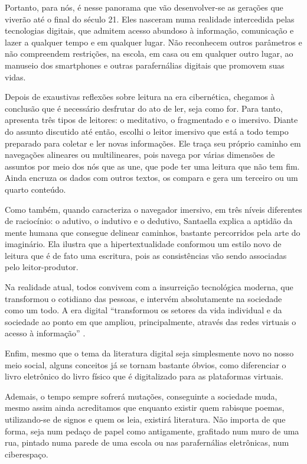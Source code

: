 \begin{refsection}
    Portanto, para nós, é nesse panorama que vão desenvolver-se as gerações que viverão até o final do século 21. Eles nasceram numa realidade intercedida pelas tecnologias digitais, que admitem acesso abundoso à informação, comunicação e lazer a qualquer tempo e em qualquer lugar. Não reconhecem outros parâmetros e não compreendem restrições, na escola, em casa ou em qualquer outro lugar, ao manuseio dos smartphones e outras parafernálias digitais que promovem suas vidas.  

    Depois de exaustivas reflexões sobre leitura na era cibernética, chegamos à conclusão que é necessário desfrutar do ato de ler, seja como for.  Para tanto, \textcite{Santaella2004Navegar} apresenta três tipos de leitores: o meditativo, o fragmentado e o imersivo. Diante do assunto discutido até então, escolhi o leitor imersivo que está a todo tempo preparado para coletar e ler novas informações. Ele traça seu próprio caminho em navegações alineares ou multilineares, pois navega por várias dimensões de assuntos por meio dos nós que as une, que pode ter uma leitura que não tem fim. Ainda encruza os dados com outros textos, os compara e gera um terceiro ou um quarto conteúdo.  

    Como também, quando caracteriza o navegador imersivo, em três níveis diferentes de raciocínio: o adutivo, o indutivo e o dedutivo, Santaella explica a aptidão da mente humana que consegue delinear caminhos, bastante percorridos pela arte do imaginário. Ela ilustra que a hipertextualidade conformou um estilo novo de leitura que é de fato uma escritura, pois as consistências vão sendo associadas pelo leitor-produtor.  

    Na realidade atual, todos convivem com a insurreição tecnológica moderna, que transformou o cotidiano das pessoas, e intervém absolutamente na sociedade como um todo. A era digital “transformou os setores da vida individual e da sociedade ao ponto em que ampliou, principalmente, através das redes virtuais o acesso à informação” \cite[p.~26]{Guzzi2010Web}.

    Enfim, mesmo que o tema da literatura digital seja simplesmente novo no nosso meio social, alguns conceitos já se tornam bastante óbvios, como diferenciar o livro eletrônico do livro físico que é digitalizado para as plataformas virtuais. 

    Ademais, o tempo sempre sofrerá mutações, conseguinte a sociedade muda, mesmo assim ainda acreditamos que enquanto existir quem rabisque poemas, utilizando-se de signos e quem os leia, existirá literatura. Não importa de que forma, seja num pedaço de papel como antigamente, grafitado num muro de uma rua, pintado numa parede de uma escola ou nas parafernálias eletrônicas, num ciberespaço. 
    

\end{refsection}
